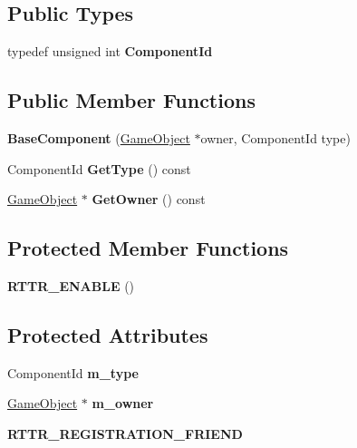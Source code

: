 \subsection*{Public Types}
\begin{DoxyCompactItemize}
\item 
\mbox{\label{classBaseComponent_a1815699cb565ac2ec254cf61174015cf}} 
typedef unsigned int {\bfseries Component\+Id}
\end{DoxyCompactItemize}
\subsection*{Public Member Functions}
\begin{DoxyCompactItemize}
\item 
\mbox{\label{classBaseComponent_a64d22c1f5eb72a53ed7584e24f55fcfe}} 
{\bfseries Base\+Component} (\hyperlink{classGameObject}{Game\+Object} $\ast$owner, Component\+Id type)
\item 
\mbox{\label{classBaseComponent_a50e4481cdb27430cf4a5a10f1a06af35}} 
Component\+Id {\bfseries Get\+Type} () const
\item 
\mbox{\label{classBaseComponent_aa07f9b9c2ebdd2c314404771857e9e07}} 
\hyperlink{classGameObject}{Game\+Object} $\ast$ {\bfseries Get\+Owner} () const
\end{DoxyCompactItemize}
\subsection*{Protected Member Functions}
\begin{DoxyCompactItemize}
\item 
\mbox{\label{classBaseComponent_a3fe4f92f22cd488107f2929b7545d878}} 
{\bfseries R\+T\+T\+R\+\_\+\+E\+N\+A\+B\+LE} ()
\end{DoxyCompactItemize}
\subsection*{Protected Attributes}
\begin{DoxyCompactItemize}
\item 
\mbox{\label{classBaseComponent_ae4de98b70923b6c515ced3a97b2f3d32}} 
Component\+Id {\bfseries m\+\_\+type}
\item 
\mbox{\label{classBaseComponent_a0b7f35e80a5033c8ba721f40927e6e75}} 
\hyperlink{classGameObject}{Game\+Object} $\ast$ {\bfseries m\+\_\+owner}
\item 
\mbox{\label{classBaseComponent_a0d398cc5055095b7b8aa5a0f6f054ad1}} 
{\bfseries R\+T\+T\+R\+\_\+\+R\+E\+G\+I\+S\+T\+R\+A\+T\+I\+O\+N\+\_\+\+F\+R\+I\+E\+ND}
\end{DoxyCompactItemize}
